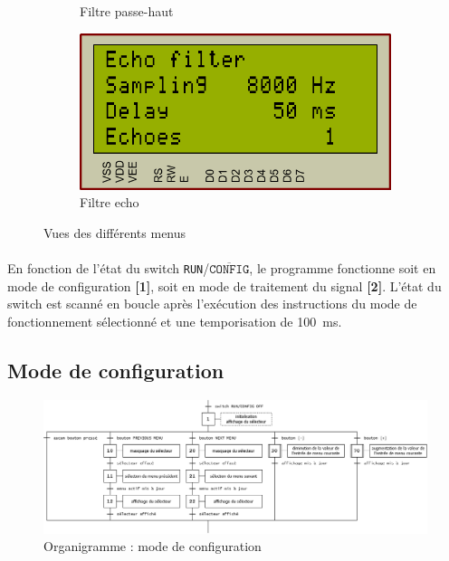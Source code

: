 \documentclass{article}
\begin{document}
\begin{figure}[H]
\begin{subfigure}[b]{0.34\textwidth}
            \caption{Filtre passe-haut}
        \end{subfigure}
        \begin{subfigure}[b]{0.34\textwidth}
            \centering
            \includegraphics[width=.9\textwidth]{./images/vue_echo.png}
            \caption{Filtre echo}
        \end{subfigure}
        \caption{Vues des différents menus}
   \end{figure}

    \paragraph{}
    En fonction de l'état du switch \texttt{RUN}/$\overline{\texttt{CONFIG}}$, le programme fonctionne soit en mode de configuration \textbf{[1]}, soit en mode de traitement du signal \textbf{[2]}. L'état du switch est scanné en boucle après l'exécution des instructions du mode de fonctionnement sélectionné et une temporisation de \SI{100}{\milli\second}.

    \subsection{Mode de configuration}
    \begin{figure}[H]
        \centering
        \includegraphics[width=\textwidth]{./images/orga_config.png}
        \caption{Organigramme : mode de configuration}
    \end{figure}
\end{document}
